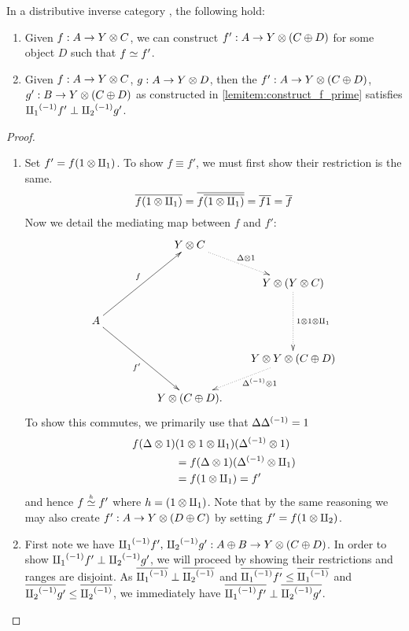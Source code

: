 \begin{lemma}\label{lem:maps_from_disjoint_sums_have_disjoint_equivalences}
  In a distributive inverse category \X, the following hold:
  \begin{enumerate}[{(}i{)}]
    \item Given $f : A \to Y\otimes C$, we can construct $f' : A \to Y \otimes (C\oplus D)$  for some object $D$ such
      that $f \overset{\scriptscriptstyle }{\simeq} f'$.\label{lemitem:construct_f_prime}
    \item Given $f : A \to Y \otimes C$, $g : A\to Y \otimes D$, then the $f' : A \to Y \otimes (C\oplus D)$,
      $g' : B \to Y \otimes (C\oplus D)$ as constructed in  \ref{lemitem:construct_f_prime} satisfies ${\amalg_{1}}^{(-1)} f'
      \perp {\amalg_{2}}^{(-1)} g'$.\label{lemitem:constructed_are_disjoint}
  \end{enumerate}
\end{lemma}
\begin{proof}
  \prepprooflist
  \begin{enumerate}[{(}i{)}]
  \item Set $f' = f(1\otimes\amalg_{1})$.
    To show $f\equiv f'$, we must first show their restriction is the same.
    \[
      \overline{f(1\otimes\amalg_{1})} = \overline{f\overline{(1\otimes\amalg_{1})}} = \overline{f 1} =  \overline{f}
    \]
    Now we detail the mediating map between $f$ and $f'$:
    \[
    \xymatrix @C=20pt @R=20pt{
      & & Y \* C \ar@{.>}[dr]^{\Delta\* 1}\\
      & & & Y \* (Y\* C) \ar@{.>}[dd]^{1\*1\*\cpa}\\
      A \ar[uurr]^f \ar[ddrr]_{f'} \\
      & & & Y \* Y\*(C\+ D) \ar@{.>}[dl]^(.4){\inv{\Delta}\* 1}\\
      && Y\*(C\+ D).
    }
    \]
  To show this commutes, we primarily use that $\Delta{\Delta}^{(-1)} = 1$
  \begin{align*}
    f(\Delta\otimes1)&(1\otimes1\otimes\amalg_{1})({\Delta}^{(-1)}\otimes1) \\
    &= f(\Delta\otimes1)({\Delta}^{(-1)} \otimes \amalg_{1})\\
    &= f(1 \otimes \amalg_{1}) = f'
  \end{align*}
  and hence $f\overset{\scriptscriptstyle h}{\simeq}f'$ where $h = (1\otimes\amalg_{1})$. Note that by the same reasoning we may also
  create $f':A\to Y\otimes(D\oplus C)$ by setting $f' = f(1\otimes\amalg_{2})$.
  \item First note we have ${\amalg_{1}}^{(-1)} f',\,{\amalg_{2}}^{(-1)} g': A\oplus B \to Y\otimes(C\oplus D)$. In order to show  ${\amalg_{1}}^{(-1)} f'
    \perp {\amalg_{2}}^{(-1)} g'$, we will proceed by showing their restrictions and ranges are disjoint.
    As $\overline{{\amalg_{1}}^{(-1)}} \perp \overline{{\amalg_{2}}^{(-1)}}$ and $\overline{{\amalg_{1}}^{(-1)}f'} \le \overline{{\amalg_{1}}^{(-1)}}$ and
    $\overline{{\amalg_{2}}^{(-1)}g'} \le \overline{{\amalg_{2}}^{(-1)}}$, we immediately have
    $\overline{{\amalg_{1}}^{(-1)}f'} \perp \overline{{\amalg_{2}}^{(-1)}g'}$.


\end{enumerate}
\end{proof}

